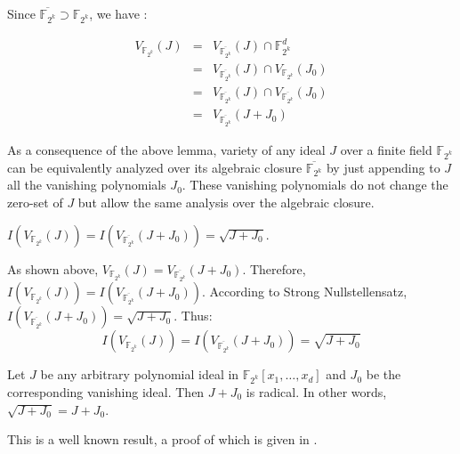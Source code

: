 \begin{Proof}
 Since $\overline {\mathbb{F}_{2^k}} \supset \mathbb{F}_{2^k}$, we have :

\begin{eqnarray}
V_{\mathbb{F}_{2^k}}(J) &= & V_{\overline {\mathbb{F}_{2^k}}}(J) \cap \mathbb{F}_{2^k}^d  \nonumber \\
 		   &= & V_{\overline {\mathbb{F}_{2^k}}}(J) \cap  V_{\mathbb{F}_{2^k}}(J_0)  \nonumber \\
 		   &= &  V_{\overline {\mathbb{F}_{2^k}}}(J) \cap  V_{\overline{\mathbb{F}_{2^k}}}(J_0) \nonumber  \\
		   &= & V_{\overline {\mathbb{F}_{2^k}}}(J+J_0) \nonumber
\end{eqnarray}
\end{Proof}

As a consequence of the above lemma, variety of any ideal $J$ over a
finite field $\mathbb{F}_{2^k}$ can be equivalently  analyzed over its
algebraic closure $\overline {\mathbb{F}_{2^k}}$ by just appending to
$J$ all the vanishing polynomials $J_0$. These vanishing polynomials
do not change the zero-set of $J$ but allow the same analysis over the
algebraic closure. 

\begin{Lemma}\label{lem:selfrad}
$I(V_{\mathbb{F}_{2^k}}(J))=I(V_{\overline {\mathbb{F}_{2^k}}}(J+J_0))=\sqrt {J+J_0}$.
\end{Lemma}

\begin{Proof}
As shown above, $V_{\mathbb{F}_{2^k}}(J)=V_{\overline {\mathbb{F}_{2^k}}}(J+J_0)$.
Therefore, $I(V_{\mathbb{F}_{2^k}}(J))=I(V_{\overline {\mathbb{F}_{2^k}}}(J+J_0))$.
According to Strong Nullstellensatz, $I(V_{\overline
  {\mathbb{F}_{2^k}}}(J+J_0))=\sqrt {J+J_0}$. Thus: 
\begin{equation}
I(V_{\mathbb{F}_{2^k}}(J))=I(V_{\overline {\mathbb{F}_{2^k}}}(J+J_0))=\sqrt {J+J_0}
\end{equation}
\end{Proof}

\begin{Lemma}\label{lem:root}
Let $J$ be any arbitrary polynomial ideal in
$\mathbb{F}_{2^k}[x_1,\dots,x_d]$ and $J_0$ be the corresponding
vanishing ideal. Then $J+J_0$ is radical. In other words, $\sqrt
{J+J_0}=J+J_0$. 
\end{Lemma}
\begin{Proof}
This is a well known result, a proof of which is given in
\cite{gao:gf-gb-ms}. 
\end{Proof}

